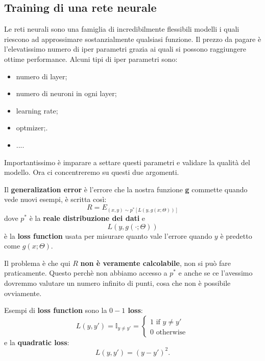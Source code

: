 \subsection{Training di una rete neurale}
Le reti neurali sono una famiglia di incredibilmente flessibili modelli i quali riescono ad approssimare sostanzialmente qualsiasi funzione. Il prezzo da pagare è l'elevatissimo numero di iper parametri grazia ai quali si possono raggiungere ottime performance. Alcuni tipi di iper parametri sono:
\begin{itemize}
    \item numero di layer;
    \item numero di neuroni in ogni layer;
    \item learning rate;
    \item optmizer;.
    \item ....
\end{itemize}


Importantissimo è imparare a settare questi parametri e validare la qualità del modello. Ora ci concentreremo su questi due argomenti.


Il \textbf{generalization error} è l'errore che la nostra funzione \textbf{g} commette quando vede nuovi esempi, è scritta così:
\begin{equation}
    R=E_{(x,y)\sim p^*[L(y,g(x;\Theta))]}
\end{equation}
dove $p^*$ è la \textbf{reale distribuzione dei dati} e 
\begin{equation}
    L(y,g(\cdot;\Theta))
\end{equation}
è la \textbf{loss function} usata per misurare quanto vale l'errore quando $y$ è predetto come $g(x;\Theta)$.

Il problema è che qui $R$ \textbf{non è veramente calcolabile}, non si può fare praticamente. Questo perchè non abbiamo accesso a $p^*$ e anche se ce l'avessimo dovremmo valutare un numero infinito di punti, cosa che non è possibile ovviamente.

Esempi di \textbf{loss function} sono la \textbf{$0-1$ loss}:
\begin{equation}
    L(y,y')=\mathbb{I}_{y\neq y'}=
    \begin{cases}
      1 \text{ if } y\neq y'\\
      0 \text{ otherwise}
    \end{cases}\,
\end{equation}
e la \textbf{quadratic loss}:
\begin{equation}
    L(y,y')=(y-y')^2.
\end{equation}


